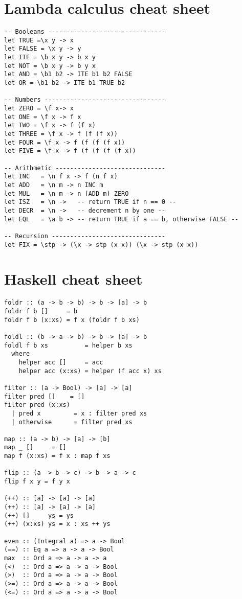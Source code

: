 \documentclass[paper=letter, fontsize=13pt]{article} %
\numberwithin{equation}{section} %
\begin{document}
\section{Lambda calculus cheat sheet}
\begin{lstlisting}
-- Booleans --------------------------------
let TRUE =\x y -> x
let FALSE = \x y -> y
let ITE = \b x y -> b x y
let NOT = \b x y -> b y x
let AND = \b1 b2 -> ITE b1 b2 FALSE 
let OR = \b1 b2 -> ITE b1 TRUE b2

-- Numbers ---------------------------------
let ZERO = \f x-> x
let ONE = \f x -> f x 
let TWO = \f x -> f (f x) 
let THREE = \f x -> f (f (f x))
let FOUR = \f x -> f (f (f (f x))
let FIVE = \f x -> f (f (f (f (f x))

-- Arithmetic ------------------------------
let INC   = \n f x -> f (n f x)
let ADD   = \n m -> n INC m 
let MUL   = \n m -> n (ADD m) ZERO
let ISZ   = \n ->   -- return TRUE if n == 0 --
let DECR  = \n ->   -- decrement n by one --  
let EQL   = \a b -> -- return TRUE if a == b, otherwise FALSE --

-- Recursion -------------------------------
let FIX = \stp -> (\x -> stp (x x)) (\x -> stp (x x))
\end{lstlisting}
\newpage
\section{Haskell cheat sheet}
\begin{lstlisting}
foldr :: (a -> b -> b) -> b -> [a] -> b
foldr f b []     = b
foldr f b (x:xs) = f x (foldr f b xs)

foldl :: (b -> a -> b) -> b -> [a] -> b
foldl f b xs          = helper b xs
  where
    helper acc []     = acc
    helper acc (x:xs) = helper (f acc x) xs

filter :: (a -> Bool) -> [a] -> [a]
filter pred []    = []
filter pred (x:xs)
  | pred x         = x : filter pred xs
  | otherwise      = filter pred xs

map :: (a -> b) -> [a] -> [b]
map _ []     = []
map f (x:xs) = f x : map f xs

flip :: (a -> b -> c) -> b -> a -> c
flip f x y = f y x

(++) :: [a] -> [a] -> [a]
(++) :: [a] -> [a] -> [a]
(++) []     ys = ys
(++) (x:xs) ys = x : xs ++ ys

even :: (Integral a) => a -> Bool
(==) :: Eq a => a -> a -> Bool
max  :: Ord a => a -> a -> a
(<)  :: Ord a => a -> a -> Bool
(>)  :: Ord a => a -> a -> Bool
(>=) :: Ord a => a -> a -> Bool
(<=) :: Ord a => a -> a -> Bool
\end{lstlisting}
\end{document}
